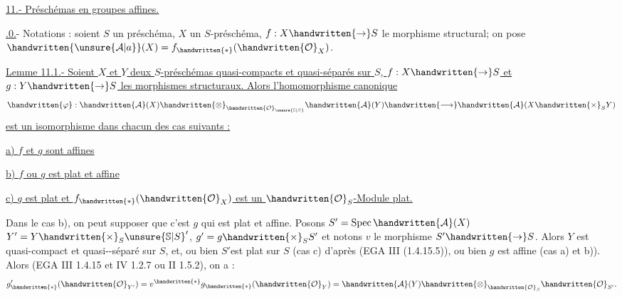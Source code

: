\uline{11.- Préschémas en groupes affines.}

\uline{.0.}- Notations : soient $S$ un préschéma, $X$ un $S$-préschéma, $f:X\handwritten{\to}S$ le morphisme structural; on pose $\handwritten{\unsure{\mathcal{A}|a}}(X)=f_{\handwritten{*}}(\handwritten{\mathcal{O}}_X)$.

\uline{Lemme 11.1.- Soient $X$ et $Y$ deux $S$-préschémas quasi-compacts et quasi-séparés sur $S$, $f:X\handwritten{\to}S$ et $g:Y\handwritten{\to}S$ les morphismes structuraux. Alors l'homomorphisme canonique}
\[
\handwritten{\varphi}:\handwritten{\mathcal{A}}(X)\handwritten{\otimes}_{\handwritten{\mathcal{O}}_{\unsure{\mathbb{S}|S}}}\handwritten{\mathcal{A}}(Y)\handwritten{\longrightarrow}\handwritten{\mathcal{A}}(X\handwritten{\times}_S Y)
\]
\uline{est un isomorphisme dans chacun des cas suivants :}

\uline{a) $f$ et $g$ sont affines}

\uline{b) $f$ ou $g$ est plat et affine}

\uline{c) $g$ est plat et $f_{\handwritten{*}}(\handwritten{\mathcal{O}}_X)$ est un $\handwritten{\mathcal{O}}_S$-Module plat.}

Dans le cas b), on peut supposer que c'est $g$ qui est plat et affine. Posons $S'=\operatorname{Spec}\handwritten{\mathcal{A}}(X)$ $Y'=Y\handwritten{\times}_S\unsure{\mathbb{S}|S}'$, $g'=g\handwritten{\times}_S S'$ et notons $v$ le morphisme $S'\handwritten{\to}S$. Alors $Y$ est quasi-compact et quasi-\linebreak -séparé sur $S$, et, ou bien $S'$est plat sur $S$ (cas c) d'après (EGA III (1.4.15.5)), ou bien $g$ est affine (cas a) et b)). Alors (EGA III 1.4.15 et IV 1.2.7 ou II 1.5.2), on a :
\[
g'_{\handwritten{*}}(\handwritten{\mathcal{O}}_{Y'})=v^{\handwritten{*}}g_{\handwritten{*}}(\handwritten{\mathcal{O}}_Y)=\handwritten{\mathcal{A}}(Y)\handwritten{\otimes}_{\handwritten{\mathcal{O}}_S}\handwritten{\mathcal{O}}_{S'}.
\]

